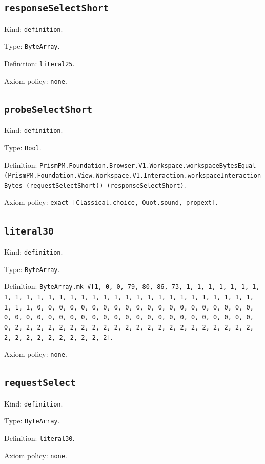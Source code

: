 \documentclass[11pt]{article}
\begin{document}
\subsection*{\texttt{responseSelectShort}}
\noindent Kind: \texttt{definition}.\par
\noindent Type: \texttt{ByteArray}.\par
\noindent Definition: \texttt{literal25}.\par
\noindent Axiom policy: \texttt{none}.\par
\subsection*{\texttt{probeSelectShort}}
\noindent Kind: \texttt{definition}.\par
\noindent Type: \texttt{Bool}.\par
\noindent Definition: \texttt{PrismPM.Foundation.Browser.V1.Workspace.workspaceBytesEqual (PrismPM.Foundation.View.Workspace.V1.Interaction.workspaceInteractionBytes (requestSelectShort)) (responseSelectShort)}.\par
\noindent Axiom policy: \texttt{exact [Classical.choice, Quot.sound, propext]}.\par
\subsection*{\texttt{literal30}}
\noindent Kind: \texttt{definition}.\par
\noindent Type: \texttt{ByteArray}.\par
\noindent Definition: \texttt{ByteArray.mk \#[1, 0, 0, 79, 80, 86, 73, 1, 1, 1, 1, 1, 1, 1, 1, 1, 1, 1, 1, 1, 1, 1, 1, 1, 1, 1, 1, 1, 1, 1, 1, 1, 1, 1, 1, 1, 1, 1, 1, 1, 0, 0, 0, 0, 0, 0, 0, 0, 0, 0, 0, 0, 0, 0, 0, 0, 0, 0, 0, 0, 0, 0, 0, 0, 0, 0, 0, 0, 0, 0, 0, 0, 0, 0, 0, 0, 0, 0, 0, 0, 0, 0, 0, 0, 2, 2, 2, 2, 2, 2, 2, 2, 2, 2, 2, 2, 2, 2, 2, 2, 2, 2, 2, 2, 2, 2, 2, 2, 2, 2, 2, 2, 2, 2, 2, 2]}.\par
\noindent Axiom policy: \texttt{none}.\par
\subsection*{\texttt{requestSelect}}
\noindent Kind: \texttt{definition}.\par
\noindent Type: \texttt{ByteArray}.\par
\noindent Definition: \texttt{literal30}.\par
\noindent Axiom policy: \texttt{none}.\par
\end{document}
